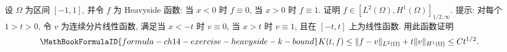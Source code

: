 \begin{MBExercise}
\label{exr:ch14-08}
设 $\Omega$ 为区间 $[-1,1]$, 并令 $f$ 为 Heavyside 函数: 当 $x<0$ 时 $f\equiv0$, 当 $x>0$ 时 $f\equiv1$. 证明 $f\in[L^2(\Omega),H^1(\Omega)]_{1/2,\infty}$. 提示: 对每个 $1>t>0$, 令 $v$ 为连续分片线性函数, 满足当 $x<-t$ 时 $v\equiv0$, 当 $x>t$ 时 $v\equiv1$, 且在 $[-t,t]$ 上为线性函数. 用此函数证明
\[
\MathBookFormulaID{formula-ch14-exercise-heavyside-k-bound}
K(t,f)\leq\|f-v\|_{L^2(\Omega)}+t\|v\|_{H^1(\Omega)}\leq Ct^{1/2}.
\]
\end{MBExercise}
